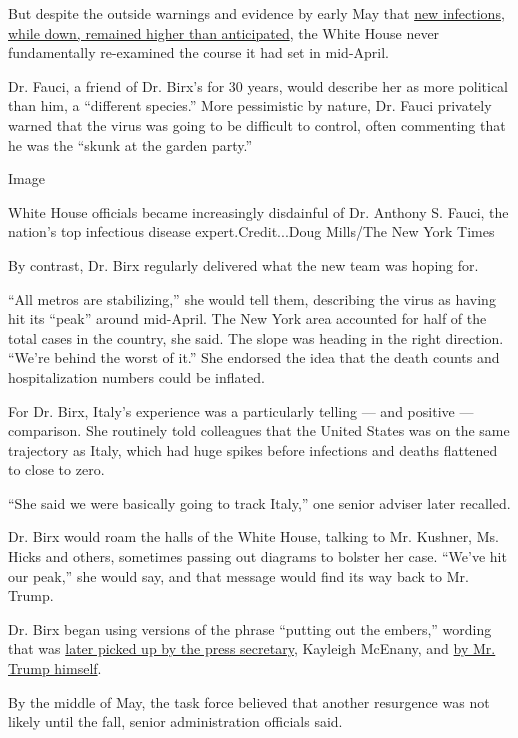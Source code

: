 But despite the outside warnings and evidence by early May that
\href{https://www.nytimes3xbfgragh.onion/interactive/2020/us/coronavirus-us-cases.html}{new
infections, while down, remained higher than anticipated}, the White
House never fundamentally re-examined the course it had set in
mid-April.

Dr. Fauci, a friend of Dr. Birx's for 30 years, would describe her as
more political than him, a ``different species.'' More pessimistic by
nature, Dr. Fauci privately warned that the virus was going to be
difficult to control, often commenting that he was the ``skunk at the
garden party.''

Image

White House officials became increasingly disdainful of Dr. Anthony S.
Fauci, the nation's top infectious disease expert.Credit...Doug
Mills/The New York Times

By contrast, Dr. Birx regularly delivered what the new team was hoping
for.

``All metros are stabilizing,'' she would tell them, describing the
virus as having hit its ``peak'' around mid-April. The New York area
accounted for half of the total cases in the country, she said. The
slope was heading in the right direction. ``We're behind the worst of
it.'' She endorsed the idea that the death counts and hospitalization
numbers could be inflated.

For Dr. Birx, Italy's experience was a particularly telling --- and
positive --- comparison. She routinely told colleagues that the United
States was on the same trajectory as Italy, which had huge spikes before
infections and deaths flattened to close to zero.

``She said we were basically going to track Italy,'' one senior adviser
later recalled.

Dr. Birx would roam the halls of the White House, talking to Mr.
Kushner, Ms. Hicks and others, sometimes passing out diagrams to bolster
her case. ``We've hit our peak,'' she would say, and that message would
find its way back to Mr. Trump.

Dr. Birx began using versions of the phrase ``putting out the embers,''
wording that was
\href{https://www.whitehouse.gov/briefings-statements/press-briefing-press-secretary-kayleigh-mcenany-062220/}{later
picked up by the press secretary}, Kayleigh McEnany, and
\href{https://twitter.com/realDonaldTrump/status/1276363261957603328?s=20}{by
Mr. Trump himself}.

By the middle of May, the task force believed that another resurgence
was not likely until the fall, senior administration officials said.

